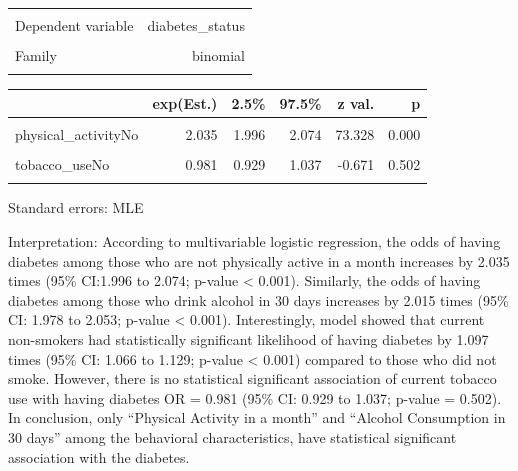 \documentclass[
  letterpaper,
  DIV=11,
  numbers=noendperiod]{scrartcl}
\begin{document}
\begin{table}[!h]
\centering
\begin{tabular}{lr}
\toprule
\cellcolor{gray!10}{Observations} & \cellcolor{gray!10}{398508 (34815 missing obs. deleted)}\\
Dependent variable & diabetes\_status\\
\cellcolor{gray!10}{Type} & \cellcolor{gray!10}{Generalized linear model}\\
Family & binomial\\
\cellcolor{gray!10}{Link} & \cellcolor{gray!10}{logit}\\
\bottomrule
\end{tabular}
\end{table}  \begin{table}[!h]
\centering
\begin{threeparttable}
\begin{tabular}{lrrrrr}
\toprule
  & exp(Est.) & 2.5\% & 97.5\% & z val. & p\\
\midrule
\cellcolor{gray!10}{(Intercept)} & \cellcolor{gray!10}{0.089} & \cellcolor{gray!10}{0.084} & \cellcolor{gray!10}{0.095} & \cellcolor{gray!10}{-79.455} & \cellcolor{gray!10}{0.000}\\
physical\_activityNo & 2.035 & 1.996 & 2.074 & 73.328 & 0.000\\
\cellcolor{gray!10}{smokingNo} & \cellcolor{gray!10}{1.097} & \cellcolor{gray!10}{1.066} & \cellcolor{gray!10}{1.129} & \cellcolor{gray!10}{6.283} & \cellcolor{gray!10}{0.000}\\
tobacco\_useNo & 0.981 & 0.929 & 1.037 & -0.671 & 0.502\\
\cellcolor{gray!10}{alc\_drnk\_30daysNo} & \cellcolor{gray!10}{2.015} & \cellcolor{gray!10}{1.978} & \cellcolor{gray!10}{2.053} & \cellcolor{gray!10}{74.048} & \cellcolor{gray!10}{0.000}\\
\bottomrule
\end{tabular}
\begin{tablenotes}
\item Standard errors: MLE
\end{tablenotes}
\end{threeparttable}
\end{table}

Interpretation: According to multivariable logistic regression, the odds
of having diabetes among those who are not physically active in a month
increases by 2.035 times (95\% CI:1.996 to 2.074; p-value \textless{}
0.001). Similarly, the odds of having diabetes among those who drink
alcohol in 30 days increases by 2.015 times (95\% CI: 1.978 to 2.053;
p-value \textless{} 0.001). Interestingly, model showed that current
non-smokers had statistically significant likelihood of having diabetes
by 1.097 times (95\% CI: 1.066 to 1.129; p-value \textless{} 0.001)
compared to those who did not smoke. However, there is no statistical
significant association of current tobacco use with having diabetes OR =
0.981 (95\% CI: 0.929 to 1.037; p-value = 0.502). In conclusion, only
``Physical Activity in a month'' and ``Alcohol Consumption in 30 days''
among the behavioral characteristics, have statistical significant
association with the diabetes.
\end{document}
